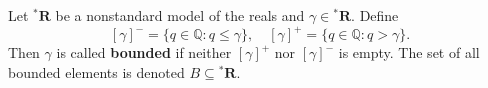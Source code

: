 Let ${^*\mathbf{R}}$ be a nonstandard model of the reals and $\gamma \in {^*\mathbf{R}}$. Define
$$[\gamma]^- = \{q \in \mathbb{Q} : q \leq \gamma\}, \quad [\gamma]^+ = \{q \in \mathbb{Q} : q > \gamma\}.$$
Then $\gamma$ is called \textbf{bounded} if neither $[\gamma]^+$ nor $[\gamma]^-$ is empty. The set of all bounded elements is denoted $B \subseteq {^*\mathbf{R}}$.
